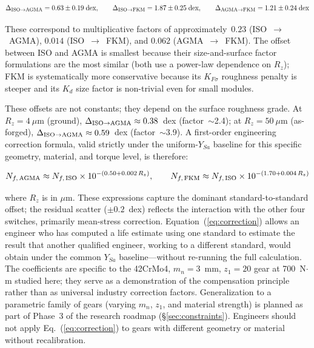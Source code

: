 \documentclass[12pt,a4paper]{article}
\begin{document}
\begin{equation}
\Delta_{\rm ISO\to AGMA} = 0.63 \pm 0.19\;\text{dex},\qquad
\Delta_{\rm ISO\to FKM}  = 1.87 \pm 0.25\;\text{dex},\qquad
\Delta_{\rm AGMA\to FKM} = 1.21 \pm 0.24\;\text{dex}
\label{eq:offsets}
\end{equation}

These correspond to multiplicative factors of approximately~$0.23$
(ISO~$\to$~AGMA), $0.014$ (ISO~$\to$~FKM), and $0.062$
(AGMA~$\to$~FKM). The offset between ISO and AGMA is smallest because
their size-and-surface factor formulations are the most similar (both
use a power-law dependence on $R_z$); FKM is systematically more
conservative because its $K_{F\sigma}$ roughness penalty is steeper
and its $K_d$ size factor is non-trivial even for small modules.

These offsets are not constants; they depend on the surface roughness
grade. At $R_z=4~\mu$m (ground), $\Delta_{\rm ISO\to AGMA} \approx
0.38$~dex (factor~$\sim$2.4); at $R_z=50~\mu$m (as-forged),
$\Delta_{\rm ISO\to AGMA} \approx 0.59$~dex (factor~$\sim$3.9). A
first-order engineering correction formula, valid strictly under the uniform-$Y_{Sa}$ baseline for this specific
geometry, material, and torque level, is therefore:

\begin{equation}
N_{f,\,{\rm AGMA}} \approx N_{f,\,{\rm ISO}} \times 10^{-(0.50 + 0.002\,R_z)},
\qquad
N_{f,\,{\rm FKM}}  \approx N_{f,\,{\rm ISO}} \times 10^{-(1.70 + 0.004\,R_z)}
\label{eq:correction}
\end{equation}

where $R_z$ is in $\mu$m. These expressions capture the dominant
standard-to-standard offset; the residual scatter ($\pm 0.2$~dex)
reflects the interaction with the other four switches, primarily
mean-stress correction. Equation~(\ref{eq:correction}) allows an
engineer who has computed a life estimate using one standard to
estimate the result that another qualified engineer, working to a
different standard, would obtain under the common $Y_{Sa}$ baseline---without re-running the full
calculation. The coefficients are specific to the 42CrMo4, $m_n=3$~mm,
$z_1=20$ gear at 700~N$\cdot$m studied here; they serve as a
demonstration of the compensation principle rather than as universal
industry correction factors. Generalization to a parametric family of
gears (varying $m_n$, $z_1$, and material strength) is planned as part
of Phase~3 of the research roadmap (\S\ref{sec:constraints}). Engineers
should not apply Eq.~(\ref{eq:correction}) to gears with different
geometry or material without recalibration.
\end{document}
